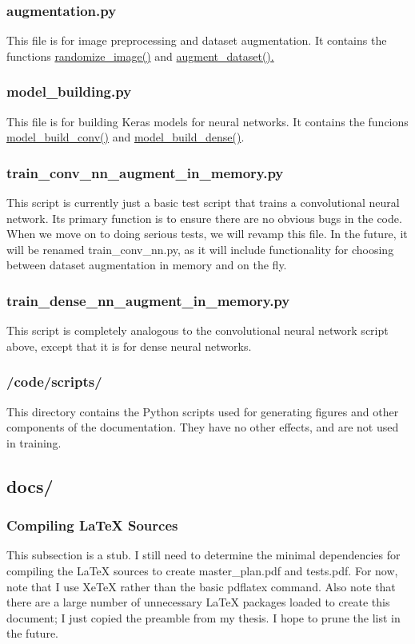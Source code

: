 \subsubsection{{\ttfamily augmentation.py}}
This file is for image preprocessing and dataset augmentation. It contains the functions \hyperref[randimg]{{\ttfamily randomize\_image()}} and \hyperref[augdata]{{\ttfamily augment\_dataset()}.}
\subsubsection{{\ttfamily model\_building.py}}
This file is for building Keras models for neural networks. It contains the funcions \hyperref[mdlbldconv]{{\ttfamily model\_build\_conv()}} and \hyperref[mdlblddense]{{\ttfamily model\_build\_dense()}}.
\subsubsection{{\ttfamily train\_conv\_nn\_augment\_in\_memory.py}}
This script is currently just a basic test script that trains a convolutional neural network. Its primary function is to ensure there are no obvious bugs in the code. When we move on to doing serious tests, we will revamp this file. In the future, it will be renamed {\ttfamily train\_conv\_nn.py}, as it will include functionality for choosing between dataset augmentation in memory and on the fly.
\subsubsection{{\ttfamily train\_dense\_nn\_augment\_in\_memory.py}}
This script is completely analogous to the convolutional neural network script above, except that it is for dense neural networks.
\subsubsection{{\ttfamily /code/scripts/}}
This directory contains the Python scripts used for generating figures and other components of the documentation. They have no other effects, and are not used in training.
\subsection{{\ttfamily docs/}}
\subsubsection{Compiling LaTeX Sources}
This subsection is a stub. I still need to determine the minimal dependencies for compiling the LaTeX sources to create {\ttfamily master\_plan.pdf} and {\ttfamily tests.pdf}. For now, note that I use XeTeX rather than the basic {\ttfamily pdflatex} command. Also note that there are a large number of unnecessary LaTeX packages loaded to create this document; I just copied the preamble from my thesis. I hope to prune the list in the future.
